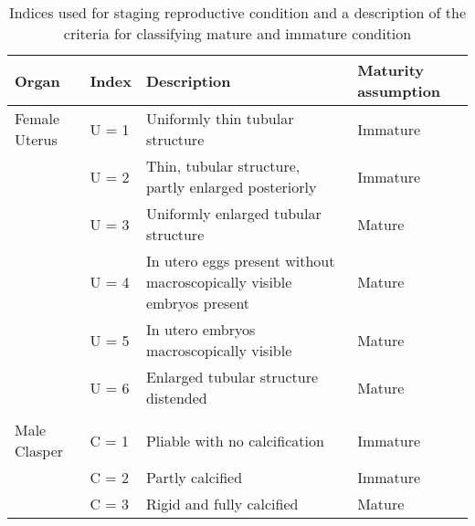 \documentclass[]{article}
\title{}
\author{}
\date{}
\begin{document}
\begin{table}[ht]
\centering
\caption{Indices used for staging reproductive condition and a description of the criteria for classifying mature and immature condition \newline} 
\begin{tabular}{llll}
  \toprule
Organ & Index & Description & Maturity assumption \\ 
  \midrule
Female Uterus & U  = 1 & Uniformly thin tubular structure & Immature \\ 
   & U  = 2 & Thin, tubular structure, partly enlarged posteriorly & Immature \\ 
   & U  = 3 & Uniformly enlarged tubular structure & Mature \\ 
   & U  = 4 & In utero eggs present without macroscopically visible embryos present & Mature \\ 
   & U  = 5 & In utero embryos macroscopically visible & Mature \\ 
   & U  = 6 & Enlarged tubular structure distended & Mature \\ 
   &  &  &  \\ 
  Male Clasper & C = 1 & Pliable with no calcification & Immature \\ 
   & C = 2 & Partly calcified & Immature \\ 
   & C = 3 & Rigid and fully calcified & Mature \\ 
   \bottomrule
\end{tabular}
\end{table}

\newpage 
\end{document}
